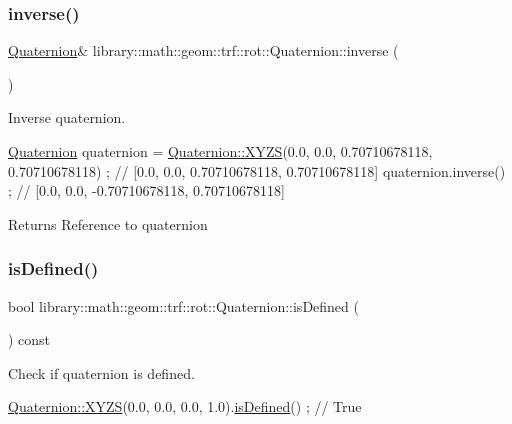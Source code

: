 \subsubsection{\texorpdfstring{inverse()}{inverse()}}
{\footnotesize\ttfamily \hyperlink{classlibrary_1_1math_1_1geom_1_1trf_1_1rot_1_1_quaternion}{Quaternion}\& library\+::math\+::geom\+::trf\+::rot\+::\+Quaternion\+::inverse (\begin{DoxyParamCaption}{ }\end{DoxyParamCaption})}



Inverse quaternion. 


\begin{DoxyCode}
\hyperlink{classlibrary_1_1math_1_1geom_1_1trf_1_1rot_1_1_quaternion_aa7f459a08f5af38b9f7676a6bf36a21c}{Quaternion} quaternion = \hyperlink{classlibrary_1_1math_1_1geom_1_1trf_1_1rot_1_1_quaternion_ad6426210c54c79fc5296b5375380a7ca}{Quaternion::XYZS}(0.0, 0.0, 0.70710678118, 0.70710678118) 
      ; \textcolor{comment}{// [0.0, 0.0, 0.70710678118, 0.70710678118]}
quaternion.inverse() ; \textcolor{comment}{// [0.0, 0.0, -0.70710678118, 0.70710678118]}
\end{DoxyCode}


\begin{DoxyReturn}{Returns}
Reference to quaternion 
\end{DoxyReturn}
\mbox{\label{classlibrary_1_1math_1_1geom_1_1trf_1_1rot_1_1_quaternion_a0d74102b65b5fdb0cd92f37455cf8c66}} 
\subsubsection{\texorpdfstring{is\+Defined()}{isDefined()}}
{\footnotesize\ttfamily bool library\+::math\+::geom\+::trf\+::rot\+::\+Quaternion\+::is\+Defined (\begin{DoxyParamCaption}{ }\end{DoxyParamCaption}) const}



Check if quaternion is defined. 


\begin{DoxyCode}
\hyperlink{classlibrary_1_1math_1_1geom_1_1trf_1_1rot_1_1_quaternion_ad6426210c54c79fc5296b5375380a7ca}{Quaternion::XYZS}(0.0, 0.0, 0.0, 1.0).\hyperlink{classlibrary_1_1math_1_1geom_1_1trf_1_1rot_1_1_quaternion_a0d74102b65b5fdb0cd92f37455cf8c66}{isDefined}() ; \textcolor{comment}{// True}
\end{DoxyCode}


